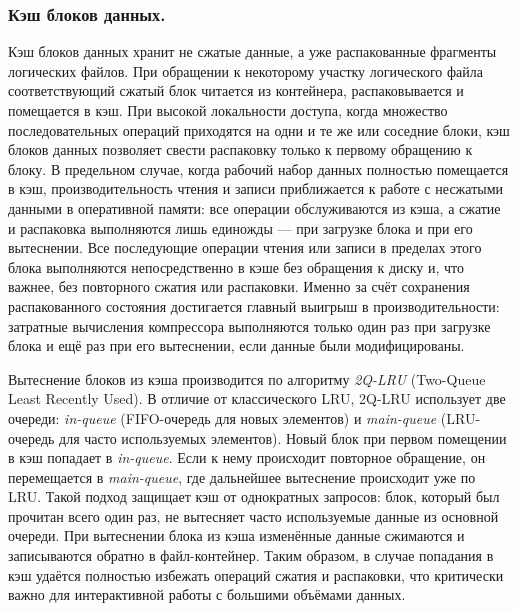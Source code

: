 \subsubsection{Кэш блоков данных.} \label{2q-lru}

Кэш блоков данных хранит не сжатые данные, а уже распакованные фрагменты логических файлов. При обращении к некоторому участку логического файла соответствующий сжатый блок читается из контейнера, распаковывается и помещается в кэш. При высокой локальности доступа, когда множество последовательных операций приходятся на одни и те же или соседние блоки, кэш блоков данных позволяет свести распаковку только к первому обращению к блоку. В предельном случае, когда рабочий набор данных полностью помещается в кэш, производительность чтения и записи приближается к работе с несжатыми данными в оперативной памяти: все операции обслуживаются из кэша, а сжатие и распаковка выполняются лишь единожды — при загрузке блока и при его вытеснении. Все последующие операции чтения или записи в пределах этого блока выполняются непосредственно в кэше без обращения к диску и, что важнее, без повторного сжатия или распаковки. Именно за счёт сохранения распакованного состояния достигается главный выигрыш в производительности: затратные вычисления компрессора выполняются только один раз при загрузке блока и ещё раз при его вытеснении, если данные были модифицированы.

Вытеснение блоков из кэша производится по алгоритму \textit{2Q-LRU}\cite{johnson1994-2q} (Two-Queue Least Recently Used). В отличие от классического LRU, 2Q-LRU использует две очереди: \textit{in-queue} (FIFO-очередь для новых элементов) и \textit{main-queue} (LRU-очередь для часто используемых элементов). Новый блок при первом помещении в кэш попадает в \textit{in-queue}. Если к нему происходит повторное обращение, он перемещается в \textit{main-queue}, где дальнейшее вытеснение происходит уже по LRU. Такой подход защищает кэш от однократных  запросов: блок, который был прочитан всего один раз, не вытесняет часто используемые данные из основной очереди. При вытеснении блока из кэша изменённые данные сжимаются и записываются обратно в файл-контейнер. Таким образом, в случае попадания в кэш удаётся полностью избежать операций сжатия и распаковки, что критически важно для интерактивной работы с большими объёмами данных.
